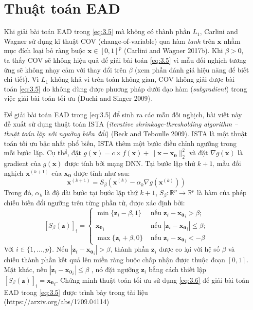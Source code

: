 \section{Thuật toán EAD}
Khi giải bài toán EAD trong \ref{eq:3.5} mà không có thành phần $L_1$, Carlini and Wagner 
sử dụng kĩ thuật COV (change-of-variable) qua hàm \textit{tanh} trên $\mathbf{x}$ nhằm 
mục đích loại bỏ ràng buộc $\mathbf{x} \in [0,1]^p$ (Carlini and Wagner 2017b). Khi 
$\beta > 0$, ta thấy COV sẽ không hiệu quả để giải bài toán \ref{eq:3.5} vì mẫu đối 
nghịch tương ứng sẽ không nhạy cảm với thay đổi trên $\beta$ (xem phần đánh giá hiệu 
năng để biết chi tiết). Vì $L_1$ không khả vi trên toàn không gian, COV không giải 
được bài toán \ref{eq:3.5} do không dùng được phương pháp dưới đạo hàm (\textit{subgradient})
trong việc giải bài toán tối ưu (Duchi and Singer 2009). 

Để giải bài toán EAD trong \ref{eq:3.5} để sinh ra các mẫu đối nghịch, bài viết này đề
xuất sử dụng thuật toán ISTA (\textit{iterative shrinkage-thresholding algorithm – thuật toán lặp 
với ngưỡng biến đổi}) (Beck and Teboulle 2009). ISTA là một thuật toán tối ưu bậc nhất
phổ biến, ISTA thêm một bước điều chỉnh ngưỡng trong mỗi bước lặp. Cụ thể, 
đặt $g(\mathbf{x}) = c \times f(\mathbf{x}) + \lVert \mathbf{x} - \mathbf{x_0} \rVert_2^2$
và đặt $\nabla g(\mathbf{x})$ là gradient của $g(\mathbf{x})$ được tính bởi mạng DNN. 
Tại bước lặp thứ $k+1$, mẫu đối nghịch $\mathbf{x}^{(k+1)}$ của $\mathbf{x_0}$ được tính 
như sau:
\begin{equation}
    \label{eq:3.6}
    \mathbf{x}^{(k+1)} = S_{\beta} (\mathbf{x}^{(k)} - \alpha_k \nabla g(\mathbf{x}^{(k)}))
\end{equation}
Trong đó, $\alpha_k$ là độ dài bước tại bước lặp thứ $k+1$, $S_{\beta} : \mathbb{R}^p \to 
\mathbb{R}^p$ là hàm của phép chiếu biến đổi ngưỡng trên từng phần tử, được xác định bởi:
\begin{equation}
    \label{eq:3.7}
    [S_{\beta}(\mathbf{z})]_i = 
    \begin{cases}
        \min \{ \mathbf{z}_i - \beta, 1 \} &\text{ nếu } \mathbf{z}_i - \mathbf{x_0}_i  > \beta; \\
        \mathbf{x_0}_i &\text{ nếu } |\mathbf{z}_i - \mathbf{x_0}_i| \leq \beta; \\
        \max \{ \mathbf{z}_i + \beta, 0 \} &\text{ nếu } \mathbf{z}_i - \mathbf{x_0}_i < -\beta
    \end{cases}
\end{equation}
Với $i \in \{ 1, ..., p \}$. Nếu $|\mathbf{z}_i - \mathbf{x_0}_i| > \beta$, thành phần 
$\mathbf{z}_i$ được co lại với hệ số $\beta$ và chiếu thành phần kết quả lên miền ràng buộc 
chấp nhận được thuộc đoạn $[0,1]$. Mặt khác, nếu $|\mathbf{z}_i - \mathbf{x_0}_i| \leq \beta$
, nó đặt ngưỡng $\mathbf{z}_i$ bằng cách thiết lập $[S_{\beta}(\mathbf{z})]_i = \mathbf{x_0}_i$.
Chứng minh thuật toán tối ưu sử dụng \ref{eq:3.6} để giải bài toán EAD trong \ref{eq:3.5}
được trình bày trong tài liệu (https://arxiv.org/abs/1709.04114) 

